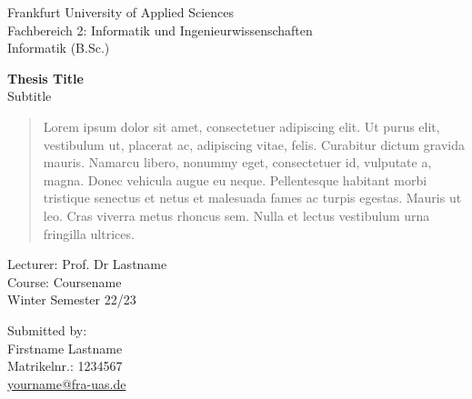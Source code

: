 \begin{titlepage}

\begin{flushleft}
Frankfurt University of Applied Sciences\\
Fachbereich 2: Informatik und Ingenieurwissenschaften\\
Informatik (B.Sc.)\\
\end{flushleft}

\begin{center}
\Large
\textbf{Thesis Title}\\
\large
Subtitle
\end{center}

\begin{abstract}
Lorem ipsum dolor sit amet, consectetuer adipiscing elit. Ut purus elit, vestibulum ut, placerat ac, adipiscing vitae, felis. Curabitur dictum gravida mauris. Namarcu libero, nonummy eget, consectetuer id, vulputate a, magna. Donec vehicula augue eu neque. Pellentesque habitant morbi tristique senectus et netus et malesuada fames ac turpis egestas. Mauris ut leo. Cras viverra metus rhoncus sem. Nulla et lectus vestibulum urna fringilla ultrices.
\end{abstract}
	
\begin{flushright}
Lecturer: Prof. Dr Lastname\\
Course: Coursename\\
Winter Semester 22/23\\
\end{flushright}

\begin{flushleft}
Submitted by:\\
Firstname Lastname\\
Matrikelnr.: 1234567\\
\href{yourname@fra-uas.de}{yourname@fra-uas.de}\\
\end{flushleft}

\end{titlepage}